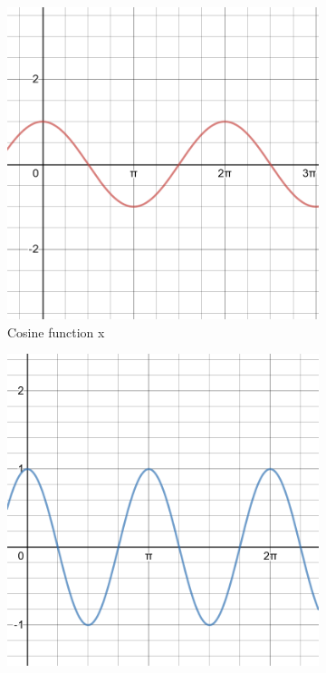 \documentclass{l4proj}
\begin{document}
\begin{figure}[]
    \centering
    \begin{subfigure}[b]{0.35\textwidth}
        \includegraphics[width=\textwidth]{images/cosine_x_graph.png}
        \caption{Cosine function x}
        \label{fig:cosx}
    \end{subfigure}
    \begin{subfigure}[b]{0.35\textwidth}
        \includegraphics[width=\textwidth]{images/cosine_2x_graph.png}

\end{subfigure}
\end{figure}
\end{document}
